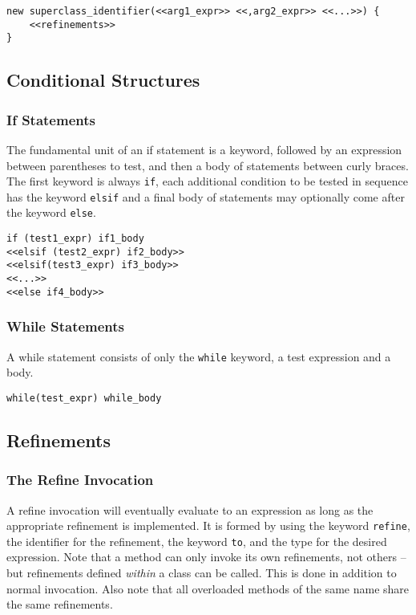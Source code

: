 \begin{lstlisting}
new superclass_identifier(<<arg1_expr>> <<,arg2_expr>> <<...>>) {
    <<refinements>>
}
\end{lstlisting}

\subsection{Conditional Structures}
\subsubsection{If Statements}
The fundamental unit of an if statement is a keyword, followed by an expression between parentheses to test, and then a body of statements between curly braces. The first keyword is always \verb!if!, each additional condition to be tested in sequence has the keyword \verb!elsif! and a final body of statements may optionally come after the keyword \verb!else!.

\begin{lstlisting}
if (test1_expr) if1_body
<<elsif (test2_expr) if2_body>>
<<elsif(test3_expr) if3_body>>
<<...>>
<<else if4_body>>
\end{lstlisting}

\subsubsection{While Statements}
A while statement consists of only the \verb!while! keyword, a test expression and a body.

\begin{lstlisting}
while(test_expr) while_body
\end{lstlisting}

\subsection{Refinements}
\subsubsection{The Refine Invocation}
A refine invocation will eventually evaluate to an expression as long as the appropriate refinement is implemented. It is formed by using the keyword \verb!refine!, the identifier for the refinement, the keyword \verb!to!, and the type for the desired expression. Note that a method can only invoke its own refinements, not others -- but refinements defined \emph{within} a class can be called. This is done in addition to normal invocation. Also note that all overloaded methods of the same name share the same refinements.

